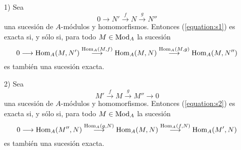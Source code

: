\documentclass[../main.tex]{subfiles}
\begin{document}
\begin{proposition}\label{pry}
\begin{itemize}
    \item[1)] Sea\begin{equation}\label{equation:s1}
        0\longrightarrow N'\overset{f}{\longrightarrow}N\overset{g}{\longrightarrow}N''
    \end{equation}
    una sucesión de $A$-módulos y homomorfismos. Entonces (\ref{equation:s1}) es exacta si, y sólo si, para todo $M\in\operatorname{Mod}_A$ la sucesión\begin{equation}\label{equation:s1'}
        0\longrightarrow \operatorname{Hom}_A(M,N')\overset{\operatorname{Hom}_A(M,f)}{\longrightarrow}\operatorname{Hom}_A(M,N)\overset{\operatorname{Hom}_A(M,g)}{\longrightarrow}\operatorname{Hom}_A(M,N'')
    \end{equation}
    es también una sucesión exacta.
    \item[2)] Sea\begin{equation}\label{equation:s2}
        M'\overset{f}{\longrightarrow}M\overset{g}{\longrightarrow}M''\longrightarrow 0
    \end{equation}
    una sucesión de $A$-módulos y homomorfismos. Entonces (\ref{equation:s2}) es exacta si, y sólo si, para todo $M\in\operatorname{Mod}_A$ la sucesión
    \begin{equation}\label{equation:s2'}0\longrightarrow\operatorname{Hom}_A(M'',N)\overset{\operatorname{Hom}_A(g,N)}{\longrightarrow}\operatorname{Hom}_A(M,N)\overset{\operatorname{Hom}_A(f,N)}{\longrightarrow}\operatorname{Hom}_A(M',N)\end{equation}
    es también una sucesión exacta.
\end{itemize}
\end{proposition}
\end{document}
